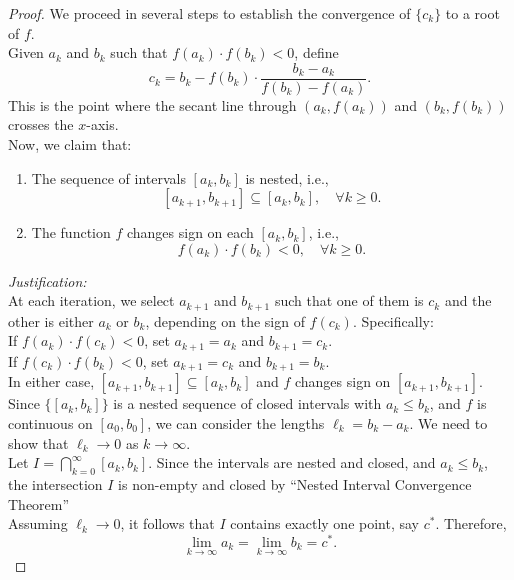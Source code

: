 \documentclass{article}
\begin{document}
\begin{proof}
    We proceed in several steps to establish the convergence of \( \{ c_k \} \) to a root of \( f \).
    \\
    Given \( a_k \) and \( b_k \) such that \( f(a_k) \cdot f(b_k) < 0 \), define
    \[
        c_k = b_k - f(b_k) \cdot \frac{b_k - a_k}{f(b_k) - f(a_k)}.
    \]
    This is the point where the secant line through \( (a_k, f(a_k)) \) and \( (b_k, f(b_k)) \) crosses the \( x \)-axis.
    \\
    Now, we claim that:
    \begin{enumerate}
        \item The sequence of intervals \( [a_k, b_k] \) is nested, i.e.,
        \[
        [a_{k+1}, b_{k+1}] \subseteq [a_k, b_k], \quad \forall k \geq 0.
        \]
        \item The function \( f \) changes sign on each \( [a_k, b_k] \), i.e.,
        \[
        f(a_k) \cdot f(b_k) < 0, \quad \forall k \geq 0.
        \]
    \end{enumerate}
    \textit{Justification:}
    \\
    At each iteration, we select \( a_{k+1} \) and \( b_{k+1} \) such that one of them is \( c_k \) and the other is either \( a_k \) or \( b_k \), depending on the sign of \( f(c_k) \). Specifically:
    \\
    If \( f(a_k) \cdot f(c_k) < 0 \), set \( a_{k+1} = a_k \) and \( b_{k+1} = c_k \).
    \\
    If \( f(c_k) \cdot f(b_k) < 0 \), set \( a_{k+1} = c_k \) and \( b_{k+1} = b_k \).
    \\
    In either case, \( [a_{k+1}, b_{k+1}] \subseteq [a_k, b_k] \) and \( f \) changes sign on \( [a_{k+1}, b_{k+1}] \).
    \\
    Since \( \{ [a_k, b_k] \} \) is a nested sequence of closed intervals with \( a_k \leq b_k \), and \( f \) is continuous on \( [a_0, b_0] \), we can consider the lengths \( \ell_k = b_k - a_k \). We need to show that \( \ell_k \to 0 \) as \( k \to \infty \).
    \\
    Let \( I = \bigcap_{k=0}^\infty [a_k, b_k] \). Since the intervals are nested and closed, and \( a_k \leq b_k \), the intersection \( I \) is non-empty and closed by ``Nested Interval Convergence Theorem''
    \\
    Assuming \( \ell_k \to 0 \), it follows that \( I \) contains exactly one point, say \( c^* \). Therefore,
    \[
        \lim_{k \to \infty} a_k = \lim_{k \to \infty} b_k = c^*.
    \]

\end{proof}
\end{document}
